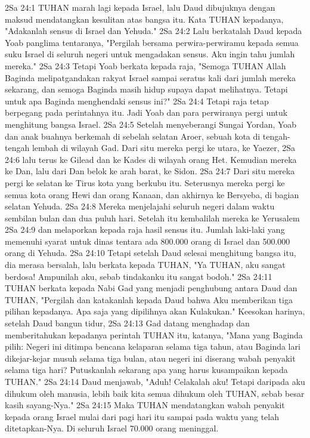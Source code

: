 2Sa 24:1  TUHAN marah lagi kepada Israel, lalu Daud dibujuknya dengan maksud mendatangkan kesulitan atas bangsa itu. Kata TUHAN kepadanya, "Adakanlah sensus di Israel dan Yehuda."
2Sa 24:2  Lalu berkatalah Daud kepada Yoab panglima tentaranya, "Pergilah bersama perwira-perwiramu kepada semua suku Israel di seluruh negeri untuk mengadakan sensus. Aku ingin tahu jumlah mereka."
2Sa 24:3  Tetapi Yoab berkata kepada raja, "Semoga TUHAN Allah Baginda melipatgandakan rakyat Israel sampai seratus kali dari jumlah mereka sekarang, dan semoga Baginda masih hidup supaya dapat melihatnya. Tetapi untuk apa Baginda menghendaki sensus ini?"
2Sa 24:4  Tetapi raja tetap berpegang pada perintahnya itu. Jadi Yoab dan para perwiranya pergi untuk menghitung bangsa Israel.
2Sa 24:5  Setelah menyeberangi Sungai Yordan, Yoab dan anak buahnya berkemah di sebelah selatan Aroer, sebuah kota di tengah-tengah lembah di wilayah Gad. Dari situ mereka pergi ke utara, ke Yaezer,
2Sa 24:6  lalu terus ke Gilead dan ke Kades di wilayah orang Het. Kemudian mereka ke Dan, lalu dari Dan belok ke arah barat, ke Sidon.
2Sa 24:7  Dari situ mereka pergi ke selatan ke Tirus kota yang berkubu itu. Seterusnya mereka pergi ke semua kota orang Hewi dan orang Kanaan, dan akhirnya ke Bersyeba, di bagian selatan Yehuda.
2Sa 24:8  Mereka menjelajahi seluruh negeri dalam waktu sembilan bulan dan dua puluh hari. Setelah itu kembalilah mereka ke Yerusalem
2Sa 24:9  dan melaporkan kepada raja hasil sensus itu. Jumlah laki-laki yang memenuhi syarat untuk dinas tentara ada 800.000 orang di Israel dan 500.000 orang di Yehuda.
2Sa 24:10  Tetapi setelah Daud selesai menghitung bangsa itu, dia merasa bersalah, lalu berkata kepada TUHAN, "Ya TUHAN, aku sangat berdosa! Ampunilah aku, sebab tindakanku itu sangat bodoh."
2Sa 24:11  TUHAN berkata kepada Nabi Gad yang menjadi penghubung antara Daud dan TUHAN, "Pergilah dan katakanlah kepada Daud bahwa Aku memberikan tiga pilihan kepadanya. Apa saja yang dipilihnya akan Kulakukan." Keesokan harinya, setelah Daud bangun tidur,
2Sa 24:13  Gad datang menghadap dan memberitahukan kepadanya perintah TUHAN itu, katanya, "Mana yang Baginda pilih: Negeri ini ditimpa bencana kelaparan selama tiga tahun, atau Baginda lari dikejar-kejar musuh selama tiga bulan, atau negeri ini diserang wabah penyakit selama tiga hari? Putuskanlah sekarang apa yang harus kusampaikan kepada TUHAN."
2Sa 24:14  Daud menjawab, "Aduh! Celakalah aku! Tetapi daripada aku dihukum oleh manusia, lebih baik kita semua dihukum oleh TUHAN, sebab besar kasih sayang-Nya."
2Sa 24:15  Maka TUHAN mendatangkan wabah penyakit kepada orang Israel mulai dari pagi hari itu sampai pada waktu yang telah ditetapkan-Nya. Di seluruh Israel 70.000 orang meninggal.
